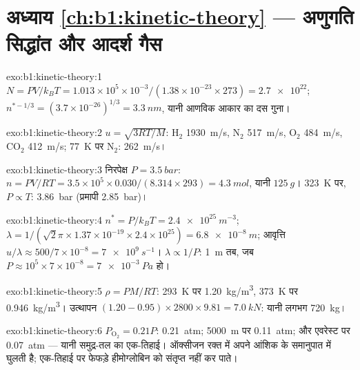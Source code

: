 \section*{अध्याय \ref{ch:b1:kinetic-theory} --- अणुगति सिद्धांत और आदर्श गैस}

\begin{solution}{exo:b1:kinetic-theory:1}
$N = PV/k_BT = 1.013\times10^5 \times 10^{-3}/(1.38\times10^{-23} \times 273) =
\num{2.7e22}$; $n^{*-1/3} = (3.7\times10^{-26})^{1/3} = \qty{3.3}{nm}$, यानी
आणविक आकार का दस गुना।
\end{solution}

\begin{solution}{exo:b1:kinetic-theory:2}
$u = \sqrt{3RT/M}$: H$_2$ \qty{1930}{m/s}, N$_2$ \qty{517}{m/s}, O$_2$
\qty{484}{m/s}, CO$_2$ \qty{412}{m/s}; \qty{77}{K} पर N$_2$: \qty{262}{m/s}।
\end{solution}

\begin{solution}{exo:b1:kinetic-theory:3}
निरपेक्ष $P = \qty{3.5}{bar}$: $n = PV/RT = 3.5\times10^5 \times 0.030/(8.314
\times 293) = \qty{4.3}{mol}$, यानी $\qty{125}{g}$। \qty{323}{K} पर, $P \propto T$:
\qty{3.86}{bar} (प्रमापी \qty{2.85}{bar})।
\end{solution}

\begin{solution}{exo:b1:kinetic-theory:4}
$n^* = P/k_BT = \qty{2.4e25}{m^{-3}}$; $\lambda = 1/(\sqrt2\pi \times 1.37\times
10^{-19} \times 2.4\times10^{25}) = \qty{6.8e-8}{m}$; आवृत्ति $u/\lambda \approx
500/7\times10^{-8} = \qty{7e9}{s^{-1}}$। $\lambda \propto 1/P$: \qty{1}{m} तब,
जब $P \approx 10^5 \times 7\times10^{-8} = \qty{7e-3}{Pa}$ हो।
\end{solution}

\begin{solution}{exo:b1:kinetic-theory:5}
$\rho = PM/RT$: \qty{293}{K} पर \qty{1.20}{kg/m^3}, \qty{373}{K} पर
\qty{0.946}{kg/m^3}। उत्थापन $(1.20 - 0.95) \times 2800 \times 9.81 = \qty{7.0}{kN}$:
यानी लगभग \qty{720}{kg}।
\end{solution}

\begin{solution}{exo:b1:kinetic-theory:6}
$P_{\mathrm{O}_2} = 0.21P$: \qty{0.21}{atm}; \qty{5000}{m} पर \qty{0.11}{atm};
और एवरेस्ट पर \qty{0.07}{atm} --- यानी समुद्र-तल का एक-तिहाई। ऑक्सीजन रक्त
में अपने आंशिक  के समानुपात में घुलती है; एक-तिहाई पर फेफड़े
हीमोग्लोबिन को संतृप्त नहीं कर पाते।
\end{solution}

